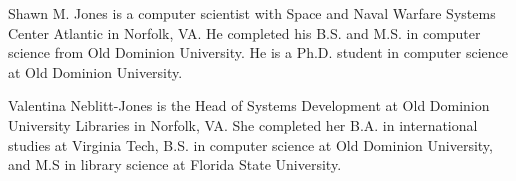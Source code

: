 \documentclass[10pt,journal,compsoc]{IEEEtran}
\begin{document}
%
%
%

% 


\begin{IEEEbiographynophoto}{Shawn M. Jones}
is a computer scientist with Space and Naval Warfare Systems Center Atlantic in Norfolk, VA. He completed his B.S. and M.S. in computer science from Old Dominion University. He is a Ph.D. student in computer science at Old Dominion University.
\end{IEEEbiographynophoto}


\begin{IEEEbiographynophoto}{Valentina Neblitt-Jones}
is the Head of Systems Development at Old Dominion University Libraries in Norfolk, VA. She completed her B.A. in international studies at Virginia Tech, B.S. in computer science at Old Dominion University, and M.S in library science at Florida State University.
\end{IEEEbiographynophoto}
\end{document}
